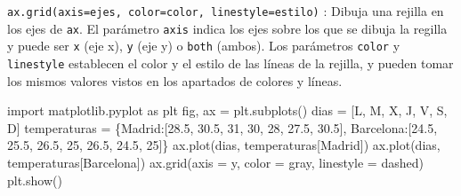 \documentclass[
  spanish,
  a4paper,
]{scrreport}
\newenvironment{Shaded}{\begin{snugshade}}{\end{snugshade}}
\newcommand{\DecValTok}[1]{\textcolor[rgb]{0.68,0.00,0.00}{#1}}
\newcommand{\FloatTok}[1]{\textcolor[rgb]{0.68,0.00,0.00}{#1}}
\newcommand{\ImportTok}[1]{\textcolor[rgb]{0.00,0.46,0.62}{#1}}
\newcommand{\NormalTok}[1]{\textcolor[rgb]{0.00,0.23,0.31}{#1}}
\newcommand{\OperatorTok}[1]{\textcolor[rgb]{0.37,0.37,0.37}{#1}}
\newcommand{\StringTok}[1]{\textcolor[rgb]{0.13,0.47,0.30}{#1}}
\begin{document}
\texttt{ax.grid(axis=ejes,\ color=color,\ linestyle=estilo)} : Dibuja
una rejilla en los ejes de \texttt{ax}. El parámetro \texttt{axis}
indica los ejes sobre los que se dibuja la regilla y puede ser
\texttt{\textquotesingle{}x\textquotesingle{}} (eje x),
\texttt{\textquotesingle{}y\textquotesingle{}} (eje y) o
\texttt{\textquotesingle{}both\textquotesingle{}} (ambos). Los
parámetros \texttt{color} y \texttt{linestyle} establecen el color y el
estilo de las líneas de la rejilla, y pueden tomar los mismos valores
vistos en los apartados de colores y líneas.

\begin{Shaded}
\begin{Highlighting}[]
\ImportTok{import}\NormalTok{ matplotlib.pyplot }\ImportTok{as}\NormalTok{ plt}
\NormalTok{fig, ax }\OperatorTok{=}\NormalTok{ plt.subplots()}
\NormalTok{dias }\OperatorTok{=}\NormalTok{ [}\StringTok{\textquotesingle{}L\textquotesingle{}}\NormalTok{, }\StringTok{\textquotesingle{}M\textquotesingle{}}\NormalTok{, }\StringTok{\textquotesingle{}X\textquotesingle{}}\NormalTok{, }\StringTok{\textquotesingle{}J\textquotesingle{}}\NormalTok{, }\StringTok{\textquotesingle{}V\textquotesingle{}}\NormalTok{, }\StringTok{\textquotesingle{}S\textquotesingle{}}\NormalTok{, }\StringTok{\textquotesingle{}D\textquotesingle{}}\NormalTok{]}
\NormalTok{temperaturas }\OperatorTok{=}\NormalTok{ \{}\StringTok{\textquotesingle{}Madrid\textquotesingle{}}\NormalTok{:[}\FloatTok{28.5}\NormalTok{, }\FloatTok{30.5}\NormalTok{, }\DecValTok{31}\NormalTok{, }\DecValTok{30}\NormalTok{, }\DecValTok{28}\NormalTok{, }\FloatTok{27.5}\NormalTok{, }\FloatTok{30.5}\NormalTok{], }\StringTok{\textquotesingle{}Barcelona\textquotesingle{}}\NormalTok{:[}\FloatTok{24.5}\NormalTok{, }\FloatTok{25.5}\NormalTok{, }\FloatTok{26.5}\NormalTok{, }\DecValTok{25}\NormalTok{, }\FloatTok{26.5}\NormalTok{, }\FloatTok{24.5}\NormalTok{, }\DecValTok{25}\NormalTok{]\}}
\NormalTok{ax.plot(dias, temperaturas[}\StringTok{\textquotesingle{}Madrid\textquotesingle{}}\NormalTok{])}
\NormalTok{ax.plot(dias, temperaturas[}\StringTok{\textquotesingle{}Barcelona\textquotesingle{}}\NormalTok{])}
\NormalTok{ax.grid(axis }\OperatorTok{=} \StringTok{\textquotesingle{}y\textquotesingle{}}\NormalTok{, color }\OperatorTok{=} \StringTok{\textquotesingle{}gray\textquotesingle{}}\NormalTok{, linestyle }\OperatorTok{=} \StringTok{\textquotesingle{}dashed\textquotesingle{}}\NormalTok{)}
\NormalTok{plt.show()}
\end{Highlighting}
\end{Shaded}
\end{document}
